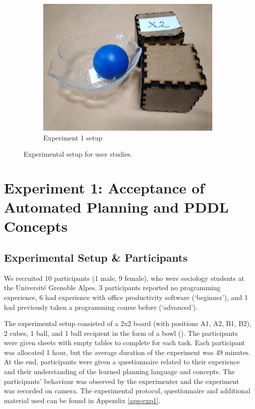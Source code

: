 \begin{figure}[htp]
\begin{subfigure}[t]{0.24\textwidth}
		\includegraphics[width=\textwidth]{figures/exp1-setup}%
		\caption{Experiment 1 setup}\label{fig:exp1-setup}%
	\end{subfigure} 	  
	\caption{Experimental setup for user studies.}
	\label{fig:pre-experiment}%
\end{figure}
\section{Experiment 1: Acceptance of Automated Planning and PDDL Concepts}\label{sec:Exp1}

\subsection{Experimental Setup \& Participants}
We recruited 10 participants (1 male, 9 female), who were sociology students at the Universit\'{e} Grenoble Alpes.
3 participants reported no programming experience, 6  had experience with office productivity software (`beginner'), and 1 had previously taken a programming course before (`advanced').

The experimental setup consisted of a 2x2 board (with positions A1, A2, B1, B2), 2 cubes, 1 ball, and 1 ball recipient in the form of a bowl ().
The participants were given sheets with empty tables to complete for each task.
Each participant was allocated 1 hour, but the average duration of the experiment was 49 minutes.
At the end, participants were given a questionnaire related to their experience and their understanding of the learned planning language and concepts.
The participants' behaviour was observed by the experimenter and the experiment was recorded on camera.
The experimental protocol, questionnaire and additional material used can be found in Appendix \ref{app:exp1}.


